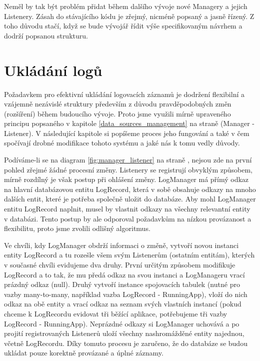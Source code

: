 \documentclass[thesis=M,czech]{FITthesis}[2012/06/26]
\begin{document}
Neměl by tak být problém přidat během dalšího vývoje nové Managery a jejich Listenery. Zásah do stávajícího kódu je zřejmý, nicméně popsaný a jasně řízený. Z toho důvodu stačí, když se bude vývojář řídit výše specifikovaným návrhem a dodrží popsanou strukturu.

\section{Ukládání logů}
Požadavkem pro efektivní ukládání logovacích záznamů je dodržení flexibilní a vzájemně nezávislé struktury především z důvodu pravděpodobných změn (rozšíření) během budoucího vývoje. Proto jsme využili mírně upraveného principu popsaného v kapitole \ref{data_sources_management} na straně \pageref{data_sources_management} (Manager - Listener). V následující kapitole si popíšeme proces jeho fungování a také v čem spočívají drobné modifikace tohoto systému a jaké nás k tomu vedly důvody.

Podíváme-li se na diagram \ref{fig:manager_listener} na straně \pageref{fig:manager_listener}, nejsou zde na první pohled zřejmé žádné procesní změny. Listenery se registrují obvyklým způsobem, mírně rozdílný je však postup při ohlášení změny. LogManager má přímý odkaz na hlavní databázovou entitu LogRecord, která v sobě obsahuje odkazy na mnoho dalších entit, které je potřeba společně uložit do databáze. Aby mohl LogManager entitu LogRecord naplnit, musel by vlastnit odkazy na všechny relevantní entity v databázi. Tento postup by ale odporoval požadavkům na nízkou provázanost a flexibilitu, proto jsme zvolili odlišný algoritmus.

Ve chvíli, kdy LogManager obdrží informaci o změně, vytvoří novou instanci entity LogRecord a tu rozešle všem svým Listenerům (ostatním entitám), kterých v současné chvíli evidujeme dva druhy. První určitým způsobem modifikuje LogRecord a to tak, že mu předá odkaz na svou instanci a LogManageru vrací prázdný odkaz (null). Druhý vytvoří instance spojovacích tabulek (nutné pro vazby many-to-many, například vazba LogRecord - RunningApp), vloží do nich odkaz na obě entity a vrací odkaz na seznam svých vlastních instancí (pokud chceme k LogRecordu evidovat tři běžící aplikace, potřebujeme tři vazby LogRecord - RunningApp). Neprázdné odkazy si LogManager uchovává a po projití registrovaných Listenerů uloží všechny nashromážděné entity najednou, včetně LogRecordu. Díky tomuto procesu je zaručeno, že do databáze se budou ukládat pouze korektně provázané a úplné záznamy.
\end{document}
